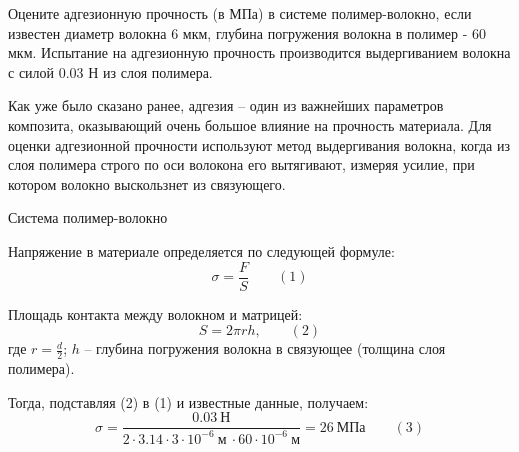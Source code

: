 
Оцените адгезионную прочность (в МПа) в системе полимер-волокно, если известен диаметр волокна 6 мкм, глубина погружения волокна в полимер - 60 мкм. Испытание на адгезионную прочность производится выдергиванием волокна с силой 0.03 Н из слоя полимера.

\explanationSection

Как уже было сказано ранее, адгезия – один из важнейших параметров композита, оказывающий очень большое влияние на прочность материала. Для оценки адгезионной прочности используют метод выдергивания волокна, когда из слоя полимера строго по оси волокона его вытягивают, измеряя усилие, при котором волокно выскользнет из связующего.

\begin{center}
    Система полимер-волокно
\end{center}

Напряжение в материале определяется по следующей формуле:
$$\sigma=\frac{F}{S} \qquad (1)$$

Площадь контакта между волокном и матрицей:
$$S=2 \pi rh,  \qquad (2) $$
где $r=\frac{d}{2}$; $h$ – глубина погружения волокна в связующее (толщина слоя полимера).

Тогда, подставляя (2) в (1) и известные данные, получаем:
$$\sigma=\frac{0.03 \: \text{Н}}{2\cdot 3.14\cdot 3\cdot 10^{-6} \: \text{м} \: \cdot 60\cdot 10^{-6} \: \text{м}}=26 \: \text{МПа}  \qquad (3)$$

